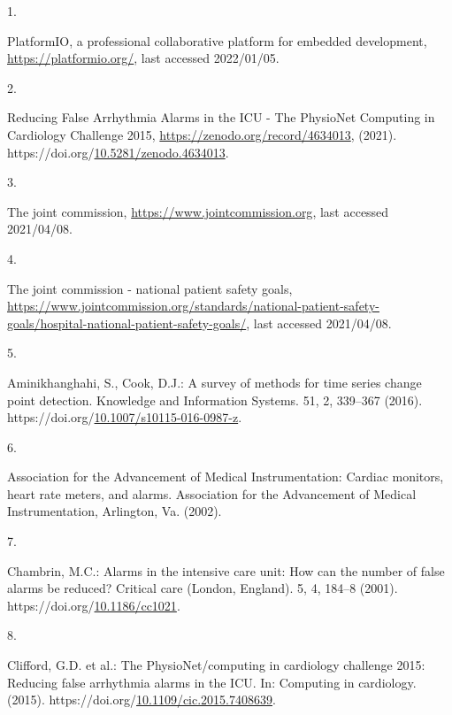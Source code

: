\documentclass[runningheads]{llncs}
\newlength{\cslhangindent}
\newlength{\csllabelwidth}
\newenvironment{CSLReferences}[2] %
 {%
  \setlength{\parindent}{0pt}
  \ifodd #1 \everypar{\setlength{\hangindent}{\cslhangindent}}\ignorespaces\fi
  \ifnum #2 > 0
  \setlength{\parskip}{#2\baselineskip}
  \fi
 }%
 {}
\newcommand{\CSLLeftMargin}[1]{\parbox[t]{\csllabelwidth}{#1}}
\newcommand{\CSLRightInline}[1]{\parbox[t]{\linewidth - \csllabelwidth}{#1}\break}
\begin{document}
\hypertarget{refs}{}
\begin{CSLReferences}{0}{0}
\leavevmode{}%
\CSLLeftMargin{1. }
\CSLRightInline{PlatformIO, a professional collaborative platform for embedded development, \url{https://platformio.org/}, last accessed 2022/01/05.}

\leavevmode{}%
\CSLLeftMargin{2. }
\CSLRightInline{Reducing False Arrhythmia Alarms in the ICU - The PhysioNet Computing in Cardiology Challenge 2015, \url{https://zenodo.org/record/4634013}, (2021). https://doi.org/\href{https://doi.org/10.5281/zenodo.4634013}{10.5281/zenodo.4634013}.}

\leavevmode{}%
\CSLLeftMargin{3. }
\CSLRightInline{The joint commission, \url{https://www.jointcommission.org}, last accessed 2021/04/08.}

\leavevmode{}%
\CSLLeftMargin{4. }
\CSLRightInline{The joint commission - national patient safety goals, \url{https://www.jointcommission.org/standards/national-patient-safety-goals/hospital-national-patient-safety-goals/}, last accessed 2021/04/08.}

\leavevmode{}%
\CSLLeftMargin{5. }
\CSLRightInline{Aminikhanghahi, S., Cook, D.J.: A survey of methods for time series change point detection. Knowledge and Information Systems. 51, 2, 339--367 (2016). https://doi.org/\href{https://doi.org/10.1007/s10115-016-0987-z}{10.1007/s10115-016-0987-z}.}

\leavevmode{}%
\CSLLeftMargin{6. }
\CSLRightInline{Association for the Advancement of Medical Instrumentation: {Cardiac monitors, heart rate meters, and alarms}. Association for the Advancement of Medical Instrumentation, Arlington, Va. (2002).}

\leavevmode{}%
\CSLLeftMargin{7. }
\CSLRightInline{Chambrin, M.C.: Alarms in the intensive care unit: How can the number of false alarms be reduced? Critical care (London, England). 5, 4, 184--8 (2001). https://doi.org/\href{https://doi.org/10.1186/cc1021}{10.1186/cc1021}.}

\leavevmode{}%
\CSLLeftMargin{8. }
\CSLRightInline{Clifford, G.D. et al.: The PhysioNet/computing in cardiology challenge 2015: Reducing false arrhythmia alarms in the ICU. In: Computing in cardiology. (2015). https://doi.org/\href{https://doi.org/10.1109/cic.2015.7408639}{10.1109/cic.2015.7408639}.}


\end{CSLReferences}
\end{document}
